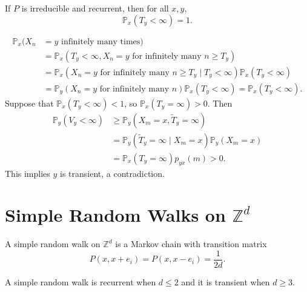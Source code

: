 \documentclass[12pt]{article}
\begin{document}
\begin{theorem}
	If $P$ is irreducible and recurrent, then for all $x, y$,
	\[
		\mathbb{P}_x(T_y < \infty) = 1
	.\]
\end{theorem}

\begin{proofbox}
\begin{align*}
	\mathbb{P}_x(X_n &= y \text{ infinitely many times}) \\
			 &= \mathbb{P}_x(T_y < \infty, X_n = y \text{ for infinitely many } n \geq T_y) \\
							    &= \mathbb{P}_x(X_n = y \text{ for infinitely many } n \geq T_y \mid T_y < \infty) \mathbb{P}_x(T_y < \infty) \\
							    &= \mathbb{P}_y(X_n = y \text{ for infinitely many } n) \mathbb{P}_x(T_y < \infty) = \mathbb{P}_x(T_y < \infty).
\end{align*}
Suppose that $\mathbb{P}_x(T_y < \infty) < 1$, so $\mathbb{P}_x(T_y = \infty) > 0$. Then
\begin{align*}
	\mathbb{P}_y(V_y < \infty) &\geq \mathbb{P}_y(X_m = x, \tilde T_y = \infty) \\
				   &=\mathbb{P}_y(\tilde T_y = \infty \mid X_m = x) \mathbb{P}_y(X_m = x) \\
				   &= \mathbb{P}_x(T_y = \infty) p_{yx}(m) > 0.
\end{align*}
This implies $y$ is transient, a contradiction.
\end{proofbox}

\section{Simple Random Walks on \texorpdfstring{$\mathbb{Z}^{d}$}{Z\^d}}%
\label{sec:simple_random_walks_on_zd}

\begin{definition}
	A simple random walk on $\mathbb{Z}^{d}$ is a Markov chain with transition matrix
	\[
		P(x, x+e_i) = P(x, x-e_i) = \frac{1}{2d}
	.\]
\end{definition}

\begin{theorem}[P\'{o}lya]
	A simple random walk is recurrent when $d \leq 2$ and it is transient when $d \geq 3$.
\end{theorem}
\end{document}
